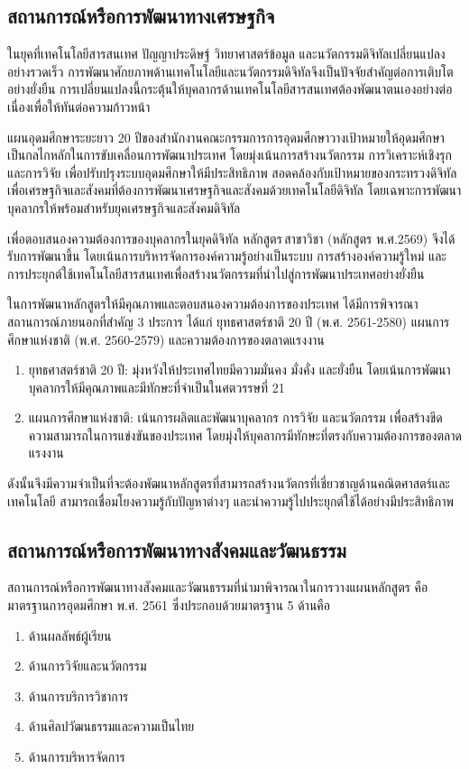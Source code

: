 {\subsection{สถานการณ์หรือการพัฒนาทางเศรษฐกิจ}
ในยุคที่เทคโนโลยีสารสนเทศ ปัญญาประดิษฐ์ วิทยาศาสตร์ข้อมูล และนวัตกรรมดิจิทัลเปลี่ยนแปลงอย่างรวดเร็ว การพัฒนาศักยภาพด้านเทคโนโลยีและนวัตกรรมดิจิทัลจึงเป็นปัจจัยสำคัญต่อการเติบโตอย่างยั่งยืน การเปลี่ยนแปลงนี้กระตุ้นให้บุคลากรด้านเทคโนโลยีสารสนเทศต้องพัฒนาตนเองอย่างต่อเนื่องเพื่อให้ทันต่อความก้าวหน้า

แผนอุดมศึกษาระยะยาว 20 ปีของสำนักงานคณะกรรมการการอุดมศึกษาวางเป้าหมายให้อุดมศึกษาเป็นกลไกหลักในการขับเคลื่อนการพัฒนาประเทศ โดยมุ่งเน้นการสร้างนวัตกรรม การวิเคราะห์เชิงรุก และการวิจัย เพื่อปรับปรุงระบบอุดมศึกษาให้มีประสิทธิภาพ สอดคล้องกับเป้าหมายของกระทรวงดิจิทัลเพื่อเศรษฐกิจและสังคมที่ต้องการพัฒนาเศรษฐกิจและสังคมด้วยเทคโนโลยีดิจิทัล โดยเฉพาะการพัฒนาบุคลากรให้พร้อมสำหรับยุคเศรษฐกิจและสังคมดิจิทัล

เพื่อตอบสนองความต้องการของบุคลากรในยุคดิจิทัล หลักสูตร\thdegree\,สาขาวิชา\thdegreebranch{} (หลักสูตร พ.ศ.2569) จึงได้รับการพัฒนาขึ้น โดยเน้นการบริหารจัดการองค์ความรู้อย่างเป็นระบบ การสร้างองค์ความรู้ใหม่ และการประยุกต์ใช้เทคโนโลยีสารสนเทศเพื่อสร้างนวัตกรรมที่นำไปสู่การพัฒนาประเทศอย่างยั่งยืน

ในการพัฒนาหลักสูตรให้มีคุณภาพและตอบสนองความต้องการของประเทศ ได้มีการพิจารณาสถานการณ์ภายนอกที่สำคัญ 3 ประการ ได้แก่ ยุทธศาสตร์ชาติ 20 ปี (พ.ศ. 2561-2580) แผนการศึกษาแห่งชาติ (พ.ศ. 2560-2579) และความต้องการของตลาดแรงงาน
\begin{enumerate}
	\item ยุทธศาสตร์ชาติ 20 ปี: มุ่งหวังให้ประเทศไทยมีความมั่นคง มั่งคั่ง และยั่งยืน โดยเน้นการพัฒนาบุคลากรให้มีคุณภาพและมีทักษะที่จำเป็นในศตวรรษที่ 21 
	\item แผนการศึกษาแห่งชาติ: เน้นการผลิตและพัฒนาบุคลากร การวิจัย และนวัตกรรม เพื่อสร้างขีดความสามารถในการแข่งขันของประเทศ โดยมุ่งให้บุคลากรมีทักษะที่ตรงกับความต้องการของตลาดแรงงาน
\end{enumerate}

ดังนั้นจึงมีความจำเป็นที่จะต้องพัฒนาหลักสูตรที่สามารถสร้างนวัตกรที่เชี่ยวชาญด้านคณิตศาสตร์และเทคโนโลยี สามารถเชื่อมโยงความรู้กับปัญหาต่างๆ และนำความรู้ไปประยุกต์ใช้ได้อย่างมีประสิทธิภาพ
\subsection{สถานการณ์หรือการพัฒนาทางสังคมและวัฒนธรรม}
สถานการณ์หรือการพัฒนาทางสังคมและวัฒนธรรมที่นำมาพิจารณาในการวางแผนหลักสูตร คือ มาตรฐานการอุดมศึกษา พ.ศ. 2561 ซึ่งประกอบด้วยมาตรฐาน 5 ด้านคือ
\begin{enumerate}[label=มาตรฐานที่ \arabic*, leftmargin=5\parindent]
	\item ด้านผลลัพธ์ผู้เรียน
	\item ด้านการวิจัยและนวัตกรรม
	\item ด้านการบริการวิชาการ
	\item ด้านศิลปวัฒนธรรมและความเป็นไทย
	\item ด้านการบริหารจัดการ
\end{enumerate}
		
}
